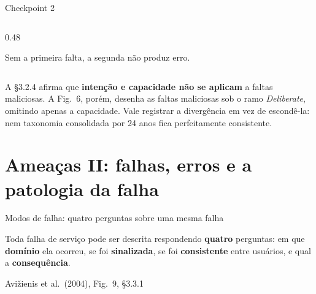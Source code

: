 \documentclass{beamer}
\newcommand{\sect}[1]{\par\smallskip\hfill{\tiny\color{black!55}Avi\v{z}ienis et al.\ (2004), #1}}
\begin{document}
\begin{frame}{Checkpoint 2}
\begin{columns}[T]
\begin{column}{0.48\textwidth}
\begin{itemize}
            \end{itemize}
            Sem a primeira falta, a segunda n\~ao produz erro.
        \end{column}
    \end{columns}
    \smallskip
    \begin{armadilha}
        \scriptsize
        A \S3.2.4 afirma que \textbf{inten\c{c}\~ao e capacidade n\~ao se aplicam} a faltas maliciosas. A Fig.\ 6, por\'em, desenha as faltas maliciosas sob o ramo \textit{Deliberate}, omitindo apenas a capacidade. Vale registrar a diverg\^encia em vez de escond\^e-la: nem taxonomia consolidada por 24 anos fica perfeitamente consistente.
    \end{armadilha}
\end{frame}

\section{Amea\c{c}as II: falhas, erros e a patologia da falha}

\begin{frame}{Modos de falha: quatro perguntas sobre uma mesma falha}
    \centering
    \diagModosFalha
    \vspace{0.2em}
    \begin{ancora}
        \scriptsize
        Toda falha de servi\c{c}o pode ser descrita respondendo \textbf{quatro} perguntas: em que \textbf{dom\'inio} ela ocorreu, se foi \textbf{sinalizada}, se foi \textbf{consistente} entre usu\'arios, e qual a \textbf{consequ\^encia}.
    \end{ancora}
    \sect{Fig.\ 9, \S3.3.1}
\end{frame}
\end{document}
